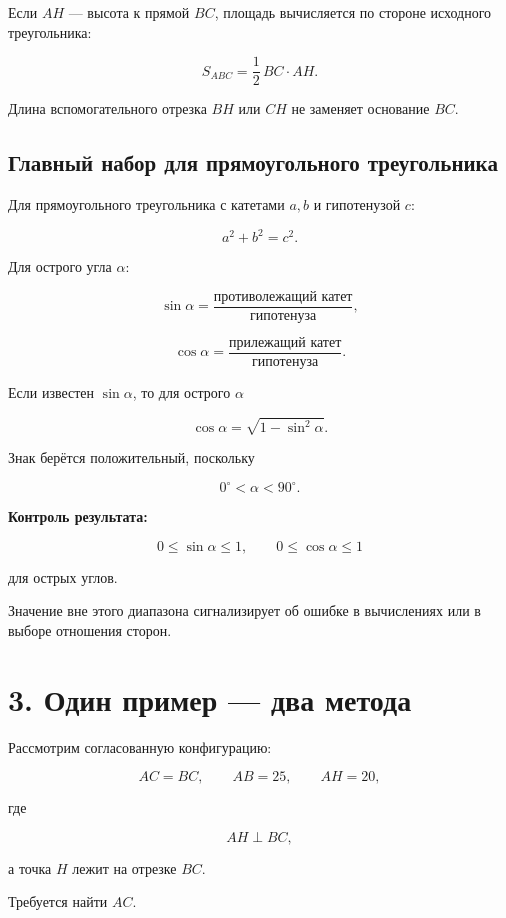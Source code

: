 \documentclass[a4paper,12pt]{article}
\newcommand{\important}[1]{%
  \textbf{\color{darkaccent}#1}%
}
\begin{document}
Если $AH$ --- высота к прямой $BC$, площадь вычисляется
по стороне исходного треугольника:

\[
S_{ABC}
=
\frac12\,BC\cdot AH.
\]

Длина вспомогательного отрезка $BH$ или $CH$
не заменяет основание $BC$.

\subsection{Главный набор для прямоугольного треугольника}

Для прямоугольного треугольника
с катетами $a,b$ и гипотенузой $c$:

\[
a^2+b^2=c^2.
\]

Для острого угла $\alpha$:

\[
\sin\alpha
=
\frac{\text{противолежащий катет}}
     {\text{гипотенуза}},
\]

\[
\cos\alpha
=
\frac{\text{прилежащий катет}}
     {\text{гипотенуза}}.
\]

Если известен $\sin\alpha$, то для острого $\alpha$

\[
\cos\alpha
=
\sqrt{1-\sin^2\alpha}.
\]

Знак берётся положительный, поскольку

\[
0^\circ<\alpha<90^\circ.
\]

\important{Контроль результата:}

\[
0\le \sin\alpha\le 1,
\qquad
0\le \cos\alpha\le 1
\]

для острых углов.

Значение вне этого диапазона сигнализирует
об ошибке в вычислениях или в выборе отношения сторон.


\clearpage
\section{3. Один пример --- два метода}

Рассмотрим согласованную конфигурацию:

\[
AC=BC,
\qquad
AB=25,
\qquad
AH=20,
\]

где

\[
AH\perp BC,
\]

а точка $H$ лежит на отрезке $BC$.

Требуется найти $AC$.
\end{document}
